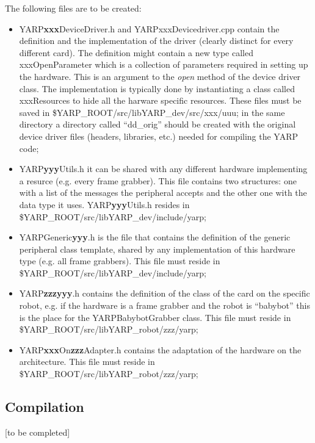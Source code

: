 The following files are to be created:
\begin{itemize}

\item YARP{\bf xxx}DeviceDriver.h and YARPxxxDevicedriver.cpp contain the definition and the implementation of the driver (clearly distinct for every different card). The definition might contain a new type called xxxOpenParameter which is a collection of parameters required in setting up the hardware. This is an argument to the {\em open} method of the device driver class. The implementation is typically done by instantiating a class called xxxResources to hide all the harware specific resources. These files must be saved in \$YARP\_ROOT/src/libYARP\_dev/src/xxx/uuu; in the same directory a directory called ``dd\_orig'' should be created with the original device driver files (headers, libraries, etc.) needed for compiling the YARP code;

\item YARP{\bf yyy}Utils.h it can be shared with any different hardware implementing a resurce (e.g. every frame grabber). This file contains two structures: one with a list of the messages the peripheral accepts and the other one with the data type it uses. YARP{\bf yyy}Utils.h resides in \$YARP\_ROOT/src/libYARP\_dev/include/yarp;

\item YARPGeneric{\bf yyy}.h is the file that contains the definition of the generic peripheral class template, shared by any implementation of this hardware type (e.g. all frame grabbers). This file must reside in \$YARP\_ROOT/src/libYARP\_dev/include/yarp;


\item YARP{\bf zzzyyy}.h contains the definition of the class of the card on the specific robot, e.g. if the hardware is a frame grabber and the robot is ``babybot'' this is the place for the YARPBabybotGrabber class. This file must reside in \$YARP\_ROOT/src/libYARP\_robot/zzz/yarp;

\item YARP{\bf xxx}On{\bf zzz}Adapter.h contains the adaptation of the hardware on the architecture. This file must reside in \$YARP\_ROOT/src/libYARP\_robot/zzz/yarp;

\end{itemize}


\subsection{Compilation}
[to be completed]


